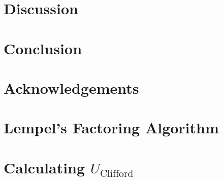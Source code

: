 \documentclass[notitlepage]{article}
\theoremstyle{definition}
\theoremstyle{problem}
\theoremstyle{lemma}
\begin{document}
	\FloatBarrier
	\section{Discussion}

	\section{Conclusion}

	\section{Acknowledgements}

	
	
	
	\appendix
	\section{Lempel's Factoring Algorithm}
	\label{ap_lempel}
	
	\section{Calculating $U_{\text{Clifford}}$}
	\label{ap_Cliff}
\end{document}
